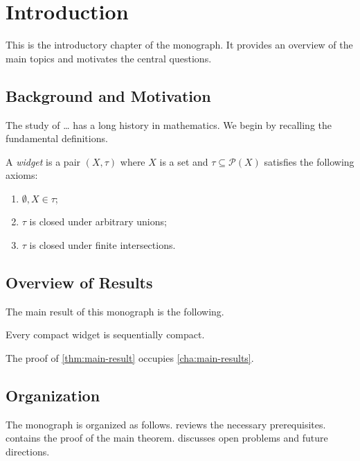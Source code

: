 
\chapter{Introduction}\label{cha:introduction}

This is the introductory chapter of the monograph.
It provides an overview of the main topics and motivates the central questions.

\section{Background and Motivation}\label{sec:background-motivation}

The study of \ldots{} has a long history in mathematics.
We begin by recalling the fundamental definitions.

\begin{definition}\label{def:fundamental-concept}
  A \emph{widget} is a pair $(X, \tau)$ where $X$ is a set and
  $\tau \subseteq \mathcal{P}(X)$ satisfies the following axioms:
  \begin{enumerate}
  \item
    $\emptyset, X \in \tau$;
  \item
    $\tau$ is closed under arbitrary unions;
  \item
    $\tau$ is closed under finite intersections.
  \end{enumerate}
\end{definition}

\section{Overview of Results}\label{sec:overview-results}

The main result of this monograph is the following.

\begin{theorem}\label{thm:main-result}
  Every compact widget is sequentially compact.
\end{theorem}

The proof of \cref{thm:main-result} occupies \cref{cha:main-results}.

\section{Organization}\label{sec:organization}

The monograph is organized as follows.
 reviews the necessary prerequisites.
 contains the proof of the main theorem.
 discusses open problems and future directions.

